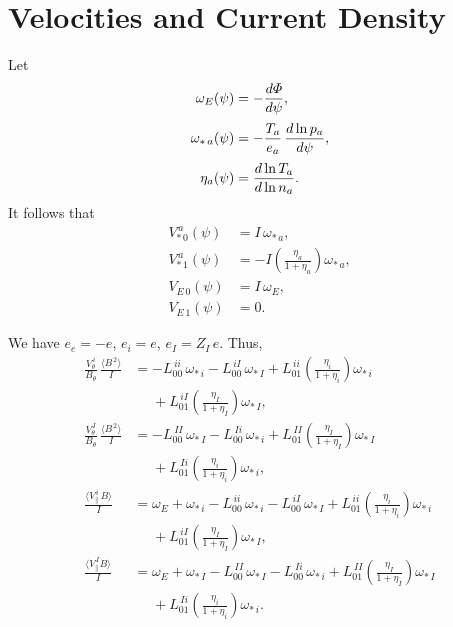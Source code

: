 \documentclass[12pt]{article}
\begin{document}
\section{Velocities and Current Density}
Let
\begin{align}
\omega_E(\psi) &=-\frac{d{\mit\Phi}}{d\psi},\\[0.5ex]
\omega_{\ast\,a}(\psi) &= -\frac{T_a}{e_a}\,\frac{d\ln p_a}{d\psi},\\[0.5ex]
\eta_a(\psi) &= \frac{d\ln T_a}{d\ln n_a}.
\end{align}
It follows that
\begin{align}
V_{\ast\,0}^{\,a}(\psi)&= I\,\omega_{\ast\,a},\\[0.5ex]
V_{\ast\,1}^{\,a}(\psi) &=-I\left(\frac{\eta_a}{1+\eta_a}\right)\omega_{\ast\,a},\\[0.5ex]
V_{E\,0}(\psi)&= I\,\omega_{E},\\[0.5ex]
V_{E\,1}(\psi) &=0.
\end{align}

We have $e_e=-e$, $e_i=e$, $e_I= Z_I\,e$. 
Thus,
\begin{align}
\frac{V_\theta^{\,i}}{B_\theta}\,\frac{\langle B^{\,2}\rangle}{I} &= -L^{\,ii}_{00}\,\omega_{\ast\,i}-
L^{\,iI}_{00}\,\omega_{\ast\,I}+L^{\,ii}_{01}\left(\frac{\eta_i}{1+\eta_i}\right)\omega_{\ast\,i}\nonumber\\[0.5ex]\phantom{=}
&\phantom{=}+L^{\,iI}_{01}\left(\frac{\eta_I}{1+\eta_I}\right)\omega_{\ast\,I},\\[0.5ex]
\frac{V_\theta^{\,I}}{B_\theta}\,\frac{\langle B^{\,2}\rangle}{I} &= -L^{\,II}_{00}\,\omega_{\ast\,I}-
L^{\,Ii}_{00}\,\omega_{\ast\,i}+L^{\,II}_{01}\left(\frac{\eta_I}{1+\eta_I}\right)\omega_{\ast\,I}\nonumber\\[0.5ex]\phantom{=}
&\phantom{=}+L^{\,Ii}_{01}\left(\frac{\eta_i}{1+\eta_i}\right)\omega_{\ast\,i},\\[0.5ex]
\frac{\langle V_\parallel^{\,i}\,B\rangle}{I} &=\omega_E +\omega_{\ast\,i}-L^{\,ii}_{00}\,\omega_{\ast\,i}-
L^{\,iI}_{00}\,\omega_{\ast\,I}+L^{\,ii}_{01}\left(\frac{\eta_i}{1+\eta_i}\right)\omega_{\ast\,i}\nonumber\\[0.5ex]\phantom{=}
&\phantom{=}+L^{\,iI}_{01}\left(\frac{\eta_I}{1+\eta_I}\right)\omega_{\ast\,I},\\[0.5ex]
\frac{\langle V_\parallel^{\,I} B\rangle}{I} &= \omega_E +\omega_{\ast\,I}-L^{\,II}_{00}\,\omega_{\ast\,I}-
L^{\,Ii}_{00}\,\omega_{\ast\,i}+L^{\,II}_{01}\left(\frac{\eta_I}{1+\eta_I}\right)\omega_{\ast\,I}\nonumber\\[0.5ex]\phantom{=}
&\phantom{=}+L^{\,Ii}_{01}\left(\frac{\eta_i}{1+\eta_i}\right)\omega_{\ast\,i}.
\end{align}
\end{document}
